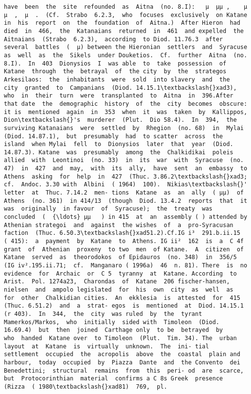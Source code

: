 \documentclass[11pt]{article}
\begin{document}
\begin{Verbatim}[commandchars=\\\{\}]
have  been  the  site  refounded  as  Aitna  (no. 8.I):   µ  µµ ,    µ         µ  ,  µ  .  (Cf.  Strabo  6.2.3,  who  focuses  exclusively  on Katane  in  his  report  on  the  foundation  of  Aitna.)  After Hieron  had  died  in  466,  the  Katanaians  returned  in  461  and expelled  the  Aitnaians  (Strabo  6.2.3),  according  to Diod. 11.76.3  after  several  battles  (  µ) between the Hieronian  settlers  and  Syracuse  as  well  as  the  Sikels  under Douketios.  Cf.  further  Aitna  (no. 8.I).  In  403  Dionysios  I  was able  to  take  possession  of  Katane  through  the  betrayal  of  the city  by  the  strategos  Arkesilaos:  the  inhabitants  were  sold  into slavery  and  the  city  granted  to  Campanians  (Diod. 14.15.1\textbackslash{}xad3), who  in  their  turn  were  transplanted  to  Aitna  in  396.After  that date  the  demographic  history  of  the  city  becomes  obscure:  it is  mentioned  again  in  353  when  it  was  taken  by  Kallippos, Dion\textbackslash{}'s  murderer  (Plut.  Dio 58.4).  In  394,  the  surviving Katanaians  were  settled  by  Rhegion  (no. 68)  in  Mylai  (Diod. 14.87.1),  but  presumably  had  to scatter  across  the  island  when Mylai  fell  to  Dionysios  later  that  year  (Diod. 14.87.3). Katane  was  presumably  among  the  Chalkidikai  poleis allied  with  Leontinoi  (no. 33)  in  its  war  with  Syracuse  (no. 47)  in  427  and  may,  with  its  ally,  have  sent  an  embassy  to Athens  asking  for  help  in  427  (Thuc. 3.86.2\textbackslash{}xad3;  cf.  Andoc. 3.30 with  Albini  ( 1964)  100).  Nikias\textbackslash{}'  letter  at  Thuc. 7.14.2  men- tions  Katane  as  an  ally  ( µµ)  of  Athens  (no. 361)  in 414/13  (though  Diod. 13.4.2  reports  that  it  was  originally  in favour  of  Syracuse);  the  treaty  was  concluded  (  {\ldots} µµ   ) in 415  at  an  assembly ( ) attended by Athenian strategoi  and  against  the wishes  of  a  pro-Syracusan  faction  (Thuc. 6.50.3\textbackslash{}xad51.2).Cf.IG i³  291.b.ii.15  ( 415):  a  payment  by  Katane  to  Athens. IG ii²  162  is  a  C 4f  grant  of  Athenian  proxeny  to two  men  of Katane.  A  citizen  of  Katane  served  as  theorodokos  of Epidauros  (no. 348)  in  356/5  (IG iv².195.ii.71;  cf.  Manganaro ( 1996a)  46  n. 81). There  is  no  evidence  for  Archaic  or  C 5  tyranny  at  Katane. According  to  Arist.  Pol. 1274a23,  Charondas  of  Katane  206 fischer-hansen,  nielsen  and  ampolo legislated  for  his  own  city  as  well  as  for  other  Chalkidian cities.  An  ekklesia  is  attested  for  415  (Thuc. 6.51.2)  and  a  strat- egos  is  mentioned  at  Diod. 14.15.1  (r 403).  In  344,  the  city  was ruled  by  the  tyrant  Mamerkos/Markos,  who  initially  sided with  Timoleon  (Diod. 16.69.4)  but  then  joined  Carthage only  to be  betrayed  by     who  handed  Katane over  to Timoleon  (Plut.  Tim. 34). The  urban  layout  at  Katane  is  virtually  unknown.  The  ini- tial  settlement  occupied  the  acropolis  above  the  coastal  plain and  harbour,  today  occupied  by  Piazza  Dante  and  the Convento  dei  Benedettini;  structural  remains  from  this  peri- od  are  scarce,  but  Protocorinthian  material  confirms a C 8s Greek  presence  (Rizza  ( 1980\textbackslash{}xad81)  769,  pl. 
\end{Verbatim}
\end{document}
